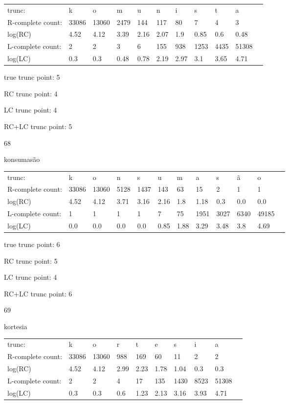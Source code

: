\documentclass{article}
\begin{document}
\begin{tabular}{l|llllllllll}
trunc: & k & o & m & u & n & i & s & t & a & \\ 
R-complete count: & 33086 & 13060 & 2479 & 144 & 117 & 80 & 7 & 4 & 3 & \\ 
log(RC) & 4.52 & 4.12 & 3.39 & 2.16 & 2.07 & 1.9 & 0.85 & 0.6 & 0.48 & \\ 
L-complete count: & 2 & 2 & 3 & 6 & 155 & 938 & 1253 & 4435 & 51308 & \\ 
log(LC) & 0.3 & 0.3 & 0.48 & 0.78 & 2.19 & 2.97 & 3.1 & 3.65 & 4.71 & \\ 
\end{tabular}

true trunc point: 5

RC trunc point: 4

LC trunc point: 4

RC+LC trunc point: 5

\vspace{1em}

68

konsumasão

\begin{tabular}{l|lllllllllll}
trunc: & k & o & n & s & u & m & a & s & ã & o & \\ 
R-complete count: & 33086 & 13060 & 5128 & 1437 & 143 & 63 & 15 & 2 & 1 & 1 & \\ 
log(RC) & 4.52 & 4.12 & 3.71 & 3.16 & 2.16 & 1.8 & 1.18 & 0.3 & 0.0 & 0.0 & \\ 
L-complete count: & 1 & 1 & 1 & 1 & 7 & 75 & 1951 & 3027 & 6340 & 49185 & \\ 
log(LC) & 0.0 & 0.0 & 0.0 & 0.0 & 0.85 & 1.88 & 3.29 & 3.48 & 3.8 & 4.69 & \\ 
\end{tabular}

true trunc point: 6

RC trunc point: 5

LC trunc point: 4

RC+LC trunc point: 6

\newpage

69

kortesia

\begin{tabular}{l|lllllllll}
trunc: & k & o & r & t & e & s & i & a & \\ 
R-complete count: & 33086 & 13060 & 988 & 169 & 60 & 11 & 2 & 2 & \\ 
log(RC) & 4.52 & 4.12 & 2.99 & 2.23 & 1.78 & 1.04 & 0.3 & 0.3 & \\ 
L-complete count: & 2 & 2 & 4 & 17 & 135 & 1430 & 8523 & 51308 & \\ 
log(LC) & 0.3 & 0.3 & 0.6 & 1.23 & 2.13 & 3.16 & 3.93 & 4.71 & \\ 
\end{tabular}
\end{document}
